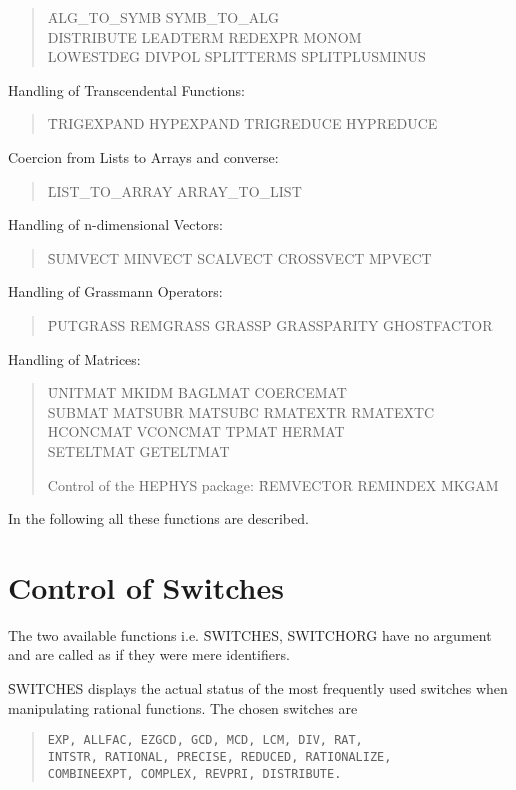 \begin{itemize}
\begin{quotation}
\noindent
\f{ALG\_TO\_SYMB SYMB\_TO\_ALG \\
DISTRIBUTE LEADTERM REDEXPR MONOM\\
LOWESTDEG DIVPOL SPLITTERMS SPLITPLUSMINUS}
\end{quotation}
\item{Handling of Transcendental Functions:}
\begin{quotation}
\noindent
\f{TRIGEXPAND HYPEXPAND TRIGREDUCE HYPREDUCE}
\end{quotation}
\item{Coercion from Lists to Arrays and converse:}
\begin{quotation}
\f{LIST\_TO\_ARRAY ARRAY\_TO\_LIST}
\end{quotation}
\item{Handling of n-dimensional Vectors:}
\begin{quotation}
\noindent
\f{SUMVECT MINVECT SCALVECT CROSSVECT MPVECT }
\end{quotation}
{\item Handling of Grassmann Operators:}
\begin{quotation}
\noindent
\f{PUTGRASS REMGRASS GRASSP GRASSPARITY GHOSTFACTOR }
\end{quotation}
\item{Handling of Matrices:}
\begin{quotation}
\noindent
\f{UNITMAT MKIDM BAGLMAT COERCEMAT \\
SUBMAT MATSUBR MATSUBC RMATEXTR RMATEXTC \\
 HCONCMAT VCONCMAT TPMAT HERMAT \\
SETELTMAT GETELTMAT}
\eq
\item{Control of the HEPHYS package:}
\bq
\noindent
\f{REMVECTOR REMINDEX MKGAM}
\end{quotation}
\end{itemize}
In the following all these functions are described.
\section{Control of Switches}
The two available functions i.e. \f{SWITCHES, SWITCHORG} have
no argument and are called as if they were mere identifiers.

\f{SWITCHES} displays the actual status of the most frequently used switches
when manipulating rational functions. The chosen switches are
\begin{quotation}
\noindent
{\tt EXP, ALLFAC, EZGCD, GCD, MCD, LCM, DIV, RAT, \\%
INTSTR, RATIONAL, PRECISE, REDUCED, RATIONALIZE, \\%
COMBINEEXPT, COMPLEX, REVPRI, DISTRIBUTE.}
\end{quotation}

